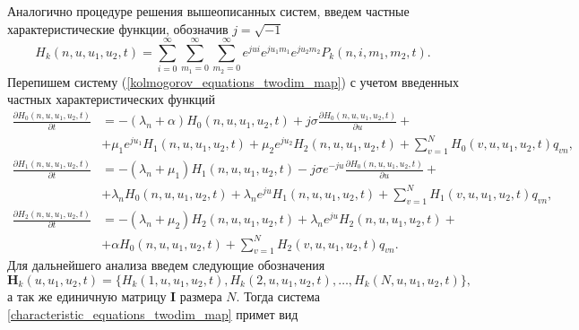 Аналогично процедуре решения вышеописанных систем, введем частные характеристические функции, обозначив $j=\sqrt{-1}$
\begin{equation*}
	H_{k}(n,u,u_{1},u_{2},t) = \sum_{i=0}^{\infty}
	\sum_{m_{1}=0}^{\infty}
	\sum_{m_{2}=0}^{\infty}  
	e^{jui}e^{ju_{1}m_{1}}e^{ju_{2}m_{2}} P_{k}(n,i,m_{1},m_{2},t).
\end{equation*}
Перепишем систему (\ref{kolmogorov_equations_twodim_map}) с учетом введенных частных характеристических функций
\begin{equation} \label{characteristic_equations_twodim_map}
	\begin{split}
		\frac{{\partial H_{0}(n,u,u_{1},u_{2},t)}}{{\partial t}} &= -(\lambda_{n} + \alpha)H_{0}(n,u,u_{1},u_{2},t) + j\sigma
		\frac{{\partial H_{0}(n,u,u_{1},u_{2},t)}}{{\partial u}} +\\  &+ \mu_{1} e^{ju_{1}}H_{1}(n,u,u_{1},u_{2},t) + \mu_{2}e^{ju_{2}}H_{2}(n,u,u_{1},u_{2},t) + \sum_{v=1}^{N}H_{0}(v,u,u_{1},u_{2},t)q_{vn} ,
		\\
		\frac{{\partial H_{1}(n,u,u_{1},u_{2},t)}}{{\partial t}} &= -(\lambda_{n} + \mu_{1})H_{1}(n,u,u_{1},u_{2},t) - j\sigma e^{-ju}
		\frac{{\partial H_{0}(n,u,u_{1},u_{2},t)}}{{\partial u}} +\\  &+ \lambda_{n} H_{0}(n,u,u_{1},u_{2},t) + \lambda_{n} e^{ju}H_{1}(n,u,u_{1},u_{2},t) + \sum_{v=1}^{N}H_{1}(v,u,u_{1},u_{2},t)q_{vn} ,
		\\
		\frac{{\partial H_{2}(n,u,u_{1},u_{2},t)}}{{\partial t}} &= -(\lambda_{n} + \mu_{2})H_{2}(n,u,u_{1},u_{2},t)  + \lambda_{n} e^{ju}H_{2}(n,u,u_{1},u_{2},t) +\\  &+ \alpha H_{0}(n,u,u_{1},u_{2},t) + \sum_{v=1}^{N}H_{2}(v,u,u_{1},u_{2},t)q_{vn}.
	\end{split}
\end{equation}  
Для дальнейшего анализа введем следующие обозначения
\begin{equation*}	
\boldsymbol{H}_{k}(u,u_{1},u_{2},t) = \{H_{k}(1,u,u_{1},u_{2},t),H_{k}(2,u,u_{1},u_{2},t),\dots,H_{k}(N,u,u_{1},u_{2},t)\},
\end{equation*}
а так же единичную матрицу $\boldsymbol{I}$ размера $N$.
Тогда система \ref{characteristic_equations_twodim_map} примет вид
